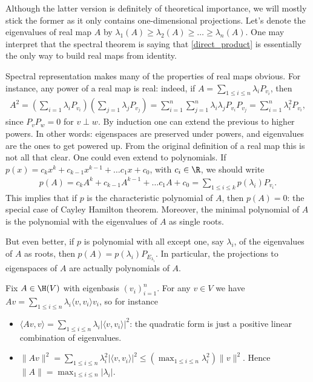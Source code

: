 Although the latter version is definitely of theoretical importance, we will mostly stick the former as it only contains one-dimensional projections. Let's denote the eigenvalues of real map $A$ by $\lambda_{1}(A) \geq \lambda_{2}(A) \geq \ldots \geq \lambda_{n}(A)$. One may interpret that the spectral theorem is saying that \ref{direct_product} is essentially the only way to build real maps from identity.

Spectral representation makes many of the properties of real maps obvious. For instance, any power of a real map is real: indeed, if $A = \sum_{1 \leq i \leq n} \lambda_{i} P_{v_{i}}$, then
\begin{align*}
	A^{2} = \left(\sum_{i = 1} \lambda_{i} P_{v_{i}}\right) \left(\sum_{j = 1} \lambda_{j} P_{v_{j}}\right) = \sum_{i = 1}^{n} \sum_{j = 1}^{n}\lambda_{i} \lambda_{j} P_{v_{i}} P_{v_{j}} = \sum_{i = 1}^{n} \lambda_{i}^2 P_{v_{i}},
\end{align*}
since $P_{v} P_{w} = 0$ for $v \perp w$. By induction one can extend the previous to higher powers. In other words: eigenspaces are preserved under powers, and eigenvalues are the ones to get powered up. From the original definition of a real map this is not all that clear. One could even extend to polynomials. If $p(x) = c_{k} x^{k} + c_{k - 1} x^{k - 1} + \ldots c_{1} x + c_{0}$, with $c_{i} \in \R$, we should write
\begin{align*}
	p(A) = c_{k} A^{k} + c_{k - 1} A^{k - 1} + \ldots c_{1} A + c_{0} = \sum_{1 \leq i \leq k} p(\lambda_{i}) P_{v_{i}}.
\end{align*}
This implies that if $p$ is the characteristic polynomial of $A$, then $p(A) = 0$: the special case of Cayley Hamilton theorem. Moreover, the minimal polynomial of $A$ is the polynomial with the eigenvalues of $A$ as single roots.

But even better, if $p$ is polynomial with all except one, say $\lambda_{i}$, of the eigenvalues of $A$ as roots, then $p(A) = p(\lambda_{i}) P_{E_{\lambda_{i}}}$. In particular, the projections to eigenspaces of $A$ are actually polynomials of $A$.

Fix $A \in \H(V)$ with eigenbasis $(v_{i})_{i = 1}^{n}$. For any $v \in V$ we have $A v = \sum_{1 \leq i \leq n} \lambda_{i} \langle v, v_{i} \rangle v_{i}$, so for instance

\begin{itemize}
\item $\langle A v, v \rangle = \sum_{1 \leq i \leq n} \lambda_{i} |\langle v, v_{i} \rangle|^{2}$: the quadratic form is just a positive linear combination of eigenvalues.
\item $\|A v\|^{2} = \sum_{1 \leq i \leq n} \lambda_{i}^{2} |\langle v, v_{i} \rangle|^{2} \leq \left(\max_{1 \leq i \leq n} \lambda_{i}^2 \right) \|v\|^{2}$. Hence $\|A\| = \max_{1 \leq i \leq n} |\lambda_{i}|$.
\end{itemize}

